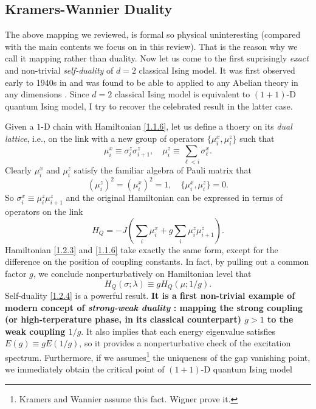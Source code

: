 \documentclass[10pt,nofootinbib]{revtex4}
\numberwithin{equation}{section}
\begin{document}
	\subsection{Kramers-Wannier Duality}
		The above mapping we reviewed, is formal so physical uninteresting (compared with the main contents we focus on in this review). That is the reason why we call it mapping rather than duality. Now let us come to the first suprisingly \emph{exact} and non-trivial \emph{self-duality} of $d=2$ classical Ising model. It was first observed early to 1940s in \cite{kramers1941statistics} and was found to be able to applied to any Abelian theory in any dimensions \cite{savit1980duality}. Since $d=2$ classical Ising model is equivalent to $(1+1)$-D quantum Ising model, I try to recover the celebrated result in the latter case.\par
		Given a $1$-D chain with Hamiltonian \eqref{1.1.6}, let us define a thoery on its \emph{dual lattice}, i.e., on the link with a new group of operators $\{\mu_i^x,\mu_i^z\}$ such that
		\begin{equation}\label{1.2.1}
			\mu^x_i\equiv\sigma^z_i\sigma_{i+1}^z,\quad \mu^z_i\equiv\sum_{\ell<i}\sigma^x_\ell.
		\end{equation}
		Clearly $\mu_i^x$ and $\mu_i^z$ satisfy the familiar algebra of Pauli matrix that
		\begin{equation*}
			(\mu_i^z)^2=(\mu_i^x)^2=1,\quad \{\mu_i^x,\mu_i^z\}=0.
		\end{equation*}
		So $\sigma_i^x\equiv \mu_i^z\mu_{i+1}^z$ and the original Hamiltonian can be expressed in terms of operators on the link
		\begin{equation}\label{1.2.3}
			H_Q=-J \left(\sum_i\mu_i^x+g\sum_i\mu_i^z\mu_{i+1}^z\right).
		\end{equation}
		Hamiltonian \eqref{1.2.3} and \eqref{1.1.6} take exactly the same form, except for the difference on the position of coupling constants. In fact, by pulling out a common factor $g$, we conclude nonperturbatively on Hamiltonian level that
		\begin{equation}\label{1.2.4}
			H_Q(\sigma;\lambda)\equiv g H_Q(\mu;1/g).
		\end{equation}
		\indent Self-duality \eqref{1.2.4} is a powerful result. \textbf{It is a first non-trivial example of modern concept of \emph{strong-weak duality} \cite{senthil2019duality}: mapping the strong coupling (or high-terperature phase, in its classical counterpart) $g>1$ to the weak coupling $1/g$}. It also implies that each energy eigenvalue satisfies $E(g)\equiv gE(1/g)$, so it provides a nonperturbative check of the excitation spectrum. Furthermore, if we assumes\footnote{Kramers and Wannier assume this fact. Wigner prove it.} the uniqueness of the gap vanishing point, we immediately obtain the critical point of $(1+1)$-D quantum Ising model
\end{document}

